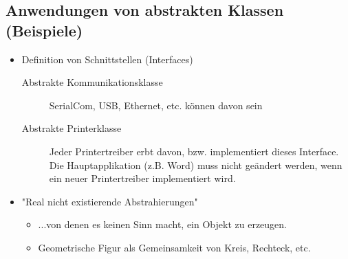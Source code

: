 \subsection{Anwendungen von abstrakten Klassen (Beispiele)}
\begin{itemize}
	\item Definition von Schnittstellen (Interfaces)
	\begin{description}
		\item[Abstrakte Kommunikationsklasse] SerialCom, USB, Ethernet, etc. können davon sein
		\item[Abstrakte Printerklasse] Jeder Printertreiber erbt davon, bzw. implementiert dieses Interface. Die Hauptapplikation (z.B. Word) muss nicht geändert werden, wenn ein neuer Printertreiber implementiert wird.
	\end{description}
	\item "Real nicht existierende Abstrahierungen"
	\begin{itemize}
		\item ...von denen es keinen Sinn macht, ein Objekt zu erzeugen.
		\item Geometrische Figur als Gemeinsamkeit von Kreis, Rechteck, etc.
	\end{itemize}
\end{itemize}

